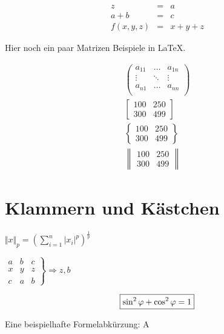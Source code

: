 \begin{equation}
	\begin{array}{lcl}
		z & = & a \\
		a + b & = & c \\
		f(x,y,z) & = & x + y + z
	\end{array}
\end{equation}

Hier noch ein paar Matrizen Beispiele in \LaTeX{}.

\begin{align}
	\begin{pmatrix}
		a_{11}	& \dots   & a_{1n}\\
		\vdots	& \ddots  & \vdots\\
		a_{n1}	& \dots   & a_{nn}\\
	\end{pmatrix}
	\\[0.4cm]
	\begin{bmatrix} 
		100&250\\
		300&499
	\end{bmatrix}
	\\[0.4cm]
	\begin{Bmatrix} 
		100&250\\
		300&499
	\end{Bmatrix}
	\\[0.4cm]
	\begin{Vmatrix}
		100&250\\
		300&499
	\end{Vmatrix}
\end{align}

\section{Klammern und Kästchen}

\begin{center}
	\( \Vert x\Vert_{p}=
	\left(
	\sum_{i=1}^{n} | x_{i} |^{p}
	\right)^{\frac{1}{p}} \)
\end{center}

\begin{center}
	\( \left.
	\begin{array}{lc|r}
		a&b&c\\
		\hline
		x&y&z\\
		c&a&b
	\end{array}
	\right\}
	\Rightarrow z,b \)
\end{center}

\begin{equation*}
\mbox{
	\boxed{
		\sin^2\varphi+\cos^2\varphi=1
	}
}
\end{equation*}


Eine beispielhafte Formelabkürzung: 
\ac{A}
